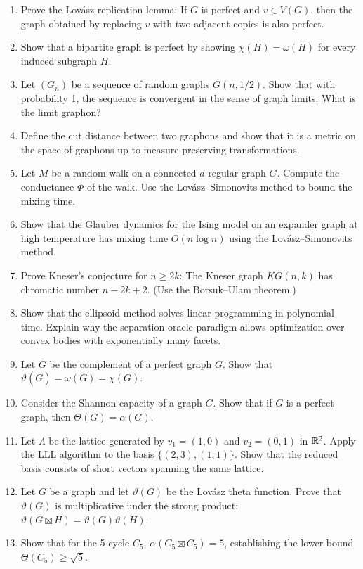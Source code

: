\begin{enumerate}
  \item [A] Prove the Lov\'{a}sz replication lemma: If \(G\) is perfect and \(v \in V(G)\), then the graph obtained by replacing \(v\) with two adjacent copies is also perfect.
  \item [B] Show that a bipartite graph is perfect by showing \(\chi(H) = \omega(H)\) for every induced subgraph \(H\).
  \item [I] Let \((G_n)\) be a sequence of random graphs \(G(n, 1/2)\). Show that with probability 1, the sequence is convergent in the sense of graph limits. What is the limit graphon?
  \item [I] Define the cut distance between two graphons and show that it is a metric on the space of graphons up to measure-preserving transformations.
  \item [I] Let \(M\) be a random walk on a connected \(d\)-regular graph \(G\). Compute the conductance \(\Phi\) of the walk. Use the Lov\'{a}sz--Simonovits method to bound the mixing time.
  \item [A] Show that the Glauber dynamics for the Ising model on an expander graph at high temperature has mixing time \(O(n \log n)\) using the Lov\'{a}sz--Simonovits method.
  \item [A] Prove Kneser's conjecture for \(n \geq 2k\): The Kneser graph \(KG(n,k)\) has chromatic number \(n - 2k + 2\). (Use the Borsuk--Ulam theorem.)
  \item [I] Show that the ellipsoid method solves linear programming in polynomial time. Explain why the separation oracle paradigm allows optimization over convex bodies with exponentially many facets.
  \item [A] Let \(\overline{G}\) be the complement of a perfect graph \(G\). Show that \(\vartheta(\overline{G}) = \omega(G) = \chi(G)\).
  \item [I] Consider the Shannon capacity of a graph \(G\). Show that if \(G\) is a perfect graph, then \(\Theta(G) = \alpha(G)\).
  \item [B] Let \(\Lambda\) be the lattice generated by \(v_1 = (1, 0)\) and \(v_2 = (0, 1)\) in \(\mathbb{R}^2\). Apply the LLL algorithm to the basis \(\{(2, 3), (1, 1)\}\). Show that the reduced basis consists of short vectors spanning the same lattice.
  \item [A] Let \(G\) be a graph and let \(\vartheta(G)\) be the Lov\'{a}sz theta function. Prove that \(\vartheta(G)\) is multiplicative under the strong product: \(\vartheta(G \boxtimes H) = \vartheta(G) \vartheta(H)\).
  \item [B] Show that for the 5-cycle \(C_5\), \(\alpha(C_5 \boxtimes C_5) = 5\), establishing the lower bound \(\Theta(C_5) \geq \sqrt{5}\).
\end{enumerate}

